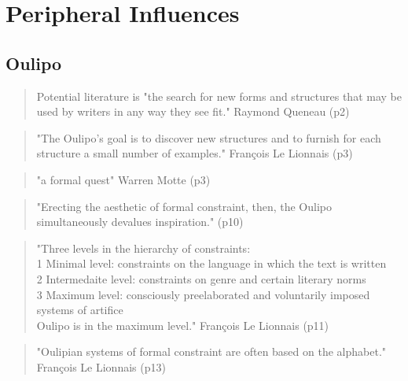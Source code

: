 \section{Peripheral Influences}

\subsection{Oulipo}


\begin{quote}
  Potential literature is "the search for new forms and structures that may be used by writers in any way they see fit." Raymond Queneau (p2)
\end{quote}

\begin{quote}
  "The Oulipo's goal is to discover new structures and to furnish for each structure a small number of examples." François Le Lionnais (p3)
\end{quote}

\begin{quote}
  "a formal quest" Warren Motte (p3)
\end{quote}

\begin{quote}
  "Erecting the aesthetic of formal constraint, then, the Oulipo simultaneously devalues inspiration." (p10)
\end{quote}

\begin{quote}
  "Three levels in the hierarchy of constraints:\\1 Minimal level: constraints on the language in which the text is written\\2 Intermedaite level: constraints on genre and certain literary norms\\3 Maximum level: consciously preelaborated and voluntarily imposed systems of artifice\\Oulipo is in the maximum level." François Le Lionnais (p11)
\end{quote}

\begin{quote}
  "Oulipian systems of formal constraint are often based on the alphabet." François Le Lionnais (p13)
\end{quote}

